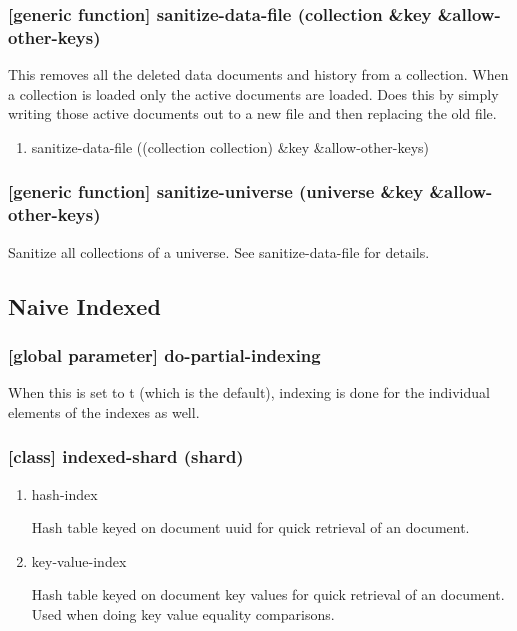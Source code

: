 \documentclass[11pt]{article}
\begin{document}
\subsubsection{[generic function] sanitize-data-file (collection \&key \&allow-other-keys)}
\label{sec:org2c1c574}

This removes all the deleted data documents and history from a
collection. When a collection is loaded only the active documents are
loaded. Does this by simply writing those active documents out to a
new file and then replacing the old file.

\begin{enumerate}
\item sanitize-data-file ((collection collection) \&key \&allow-other-keys)
\label{sec:org8c93b75}
\end{enumerate}

\subsubsection{[generic function] sanitize-universe (universe \&key \&allow-other-keys)}
\label{sec:org120556e}

Sanitize all collections of a universe. See sanitize-data-file for details.

\subsection{Naive Indexed}
\label{sec:org2d8882d}

\subsubsection{[global parameter] \textbf{do-partial-indexing}}
\label{sec:org0ea2994}

When this is set to t (which is the default), indexing is done for the
individual elements of the indexes as well.

\subsubsection{[class] indexed-shard (shard)}
\label{sec:orgaca3f66}

\begin{enumerate}
\item\relax [accessor] hash-index
\label{sec:org0e8ed67}

Hash table keyed on document uuid for quick retrieval of an document.

\item\relax [accessor] key-value-index
\label{sec:orgda61769}

Hash table keyed on document key values for quick retrieval of an document.
Used when doing key value equality comparisons.
\end{enumerate}
\end{document}
